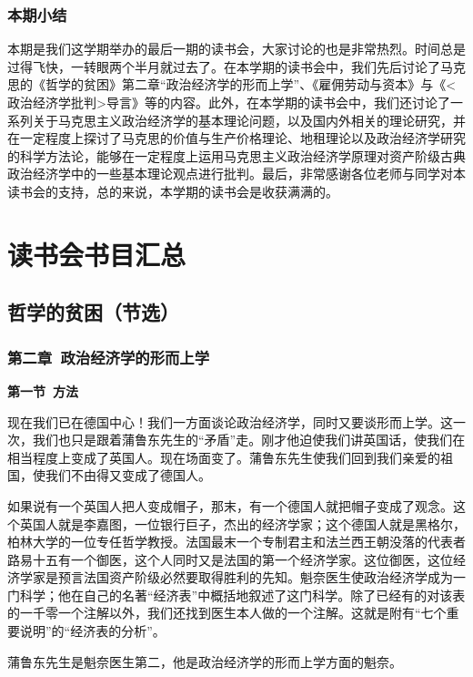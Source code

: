 \documentclass[a4paper,twoside,12pt,AutoFakeBold]{ctexart}
\begin{document}
\subsubsection{本期小结}
本期是我们这学期举办的最后一期的读书会，大家讨论的也是非常热烈。时间总是过得飞快，一转眼两个半月就过去了。在本学期的读书会中，我们先后讨论了马克思的《哲学的贫困》第二章“政治经济学的形而上学”、《雇佣劳动与资本》与《<政治经济学批判>导言》等的内容。此外，在本学期的读书会中，我们还讨论了一系列关于马克思主义政治经济学的基本理论问题，以及国内外相关的理论研究，并在一定程度上探讨了马克思的价值与生产价格理论、地租理论以及政治经济学研究的科学方法论，能够在一定程度上运用马克思主义政治经济学原理对资产阶级古典政治经济学中的一些基本理论观点进行批判。最后，非常感谢各位老师与同学对本读书会的支持，总的来说，本学期的读书会是收获满满的。






\newpage
\section{读书会书目汇总}
\subsection{哲学的贫困（节选）}
\subsubsection{第二章~政治经济学的形而上学}
\begin{center}
    \textbf{第一节~方法}
\end{center}

现在我们已在德国中心！我们一方面谈论政治经济学，同时又要谈形而上学。这一次，我们也只是跟着蒲鲁东先生的“矛盾”走。刚才他迫使我们讲英国话，使我们在相当程度上变成了英国人。现在场面变了。蒲鲁东先生使我们回到我们亲爱的祖国，使我们不由得又变成了德国人。

如果说有一个英国人把人变成帽子，那末，有一个德国人就把帽子变成了观念。这个英国人就是李嘉图，一位银行巨子，杰出的经济学家；这个德国人就是黑格尔，柏林大学的一位专任哲学教授。法国最末一个专制君主和法兰西王朝没落的代表者路易十五有一个御医，这个人同时又是法国的第一个经济学家。这位御医，这位经济学家是预言法国资产阶级必然要取得胜利的先知。魁奈医生使政治经济学成为一门科学；他在自己的名著“经济表”中概括地叙述了这门科学。除了已经有的对该表的一千零一个注解以外，我们还找到医生本人做的一个注解。这就是附有“七个重要说明”的“经济表的分析”。

蒲鲁东先生是魁奈医生第二，他是政治经济学的形而上学方面的魁奈。
\end{document}
